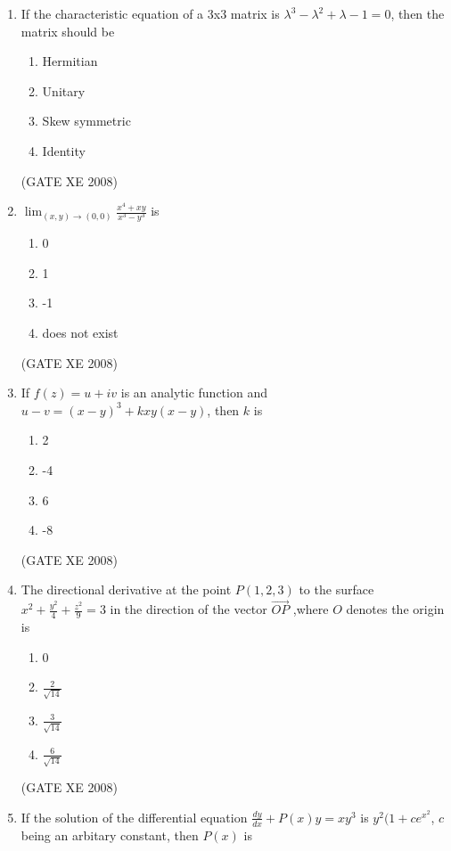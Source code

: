 \documentclass[12pt]{article}
\begin{document}
\begin{enumerate}
\item If the characteristic equation of a 3x3 matrix is $\lambda^3 - \lambda^2 + \lambda - 1 =0$, then the matrix should be 

\begin{enumerate}

\item  Hermitian 
\item Unitary
 \item Skew symmetric
\item Identity

\end{enumerate}

(GATE XE 2008)

\item {\large $\lim_{(x,y) \to (0,0)} \frac{x^4 + xy}{x^3 - y^3} $} is

\begin{enumerate}
\item 0
\item 1
\item -1
\item does not exist

\end{enumerate}
(GATE XE 2008)
\item If $f(z)= u + iv$ is an analytic function and $u-v=(x-y)^3 + kxy(x-y)$, then $k$ is

\begin{enumerate}
\item  2
\item  -4
\item  6
\item -8
\end{enumerate}

(GATE XE 2008)
\item The directional derivative at the point $P(1,2,3)$ to the surface {\large $x^2 + \frac{y^2}{4} + \frac{z^2}{9} =3$} in the direction of the vector $\overrightarrow{OP}$ ,where $O$ denotes the origin is

\begin{enumerate}
\item 0
\item {\Large $\frac{2}{\sqrt{14}}$}
\item {\Large $\frac{3}{\sqrt{14}}$}
\item {\Large $\frac{6}{\sqrt{14}}$}
\end{enumerate}

(GATE XE 2008)
\item If the solution of the differential equation $\frac{dy}{dx} + P(x)y = xy^3$ is $y^2(1+ce^{x^2}$, $c$ being an arbitary constant, then $P(x)$ is


\end{enumerate}
\end{document}
